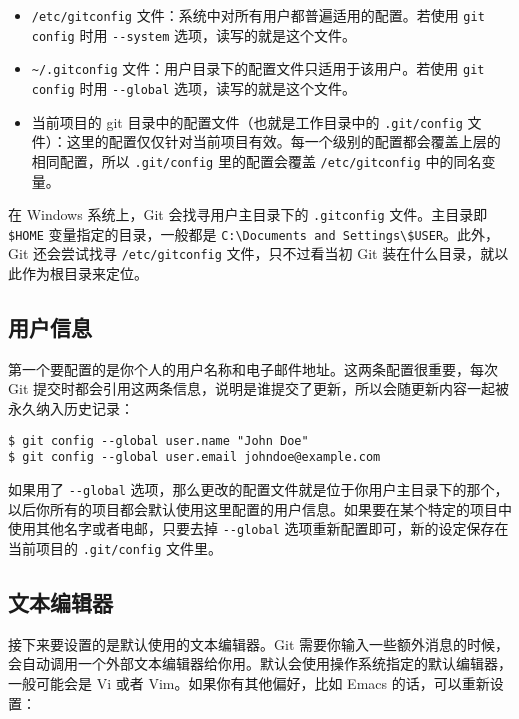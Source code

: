\documentclass[a4paper]{book}
\begin{document}
\begin{itemize}
\itemsep1pt\parskip0pt
\item
  \texttt{/etc/gitconfig} 文件：系统中对所有用户都普遍适用的配置。若使用 \texttt{git config} 时用 \texttt{-{}-system} 选项，读写的就是这个文件。
\item
  \texttt{\textasciitilde{}/.gitconfig} 文件：用户目录下的配置文件只适用于该用户。若使用 \texttt{git config} 时用 \texttt{-{}-global} 选项，读写的就是这个文件。
\item
  当前项目的 git 目录中的配置文件（也就是工作目录中的 \texttt{.git/config} 文件）：这里的配置仅仅针对当前项目有效。每一个级别的配置都会覆盖上层的相同配置，所以 \texttt{.git/config} 里的配置会覆盖 \texttt{/etc/gitconfig} 中的同名变量。
\end{itemize}

在 Windows 系统上，Git 会找寻用户主目录下的 \texttt{.gitconfig} 文件。主目录即 \texttt{\$HOME} 变量指定的目录，一般都是 \texttt{C:\textbackslash{}Documents and Settings\textbackslash{}\$USER}。此外，Git 还会尝试找寻 \texttt{/etc/gitconfig} 文件，只不过看当初 Git 装在什么目录，就以此作为根目录来定位。

\subsection{用户信息}

第一个要配置的是你个人的用户名称和电子邮件地址。这两条配置很重要，每次 Git 提交时都会引用这两条信息，说明是谁提交了更新，所以会随更新内容一起被永久纳入历史记录：

\begin{shaded}\begin{verbatim}
$ git config --global user.name "John Doe"
$ git config --global user.email johndoe@example.com
\end{verbatim}\end{shaded}

如果用了 \texttt{-{}-global} 选项，那么更改的配置文件就是位于你用户主目录下的那个，以后你所有的项目都会默认使用这里配置的用户信息。如果要在某个特定的项目中使用其他名字或者电邮，只要去掉 \texttt{-{}-global} 选项重新配置即可，新的设定保存在当前项目的 \texttt{.git/config} 文件里。

\subsection{文本编辑器}

接下来要设置的是默认使用的文本编辑器。Git 需要你输入一些额外消息的时候，会自动调用一个外部文本编辑器给你用。默认会使用操作系统指定的默认编辑器，一般可能会是 Vi 或者 Vim。如果你有其他偏好，比如 Emacs 的话，可以重新设置：
\end{document}
